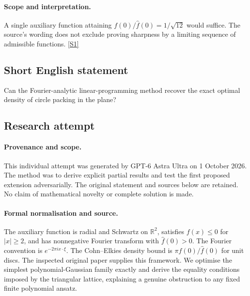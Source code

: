 \documentclass[11pt,a4paper]{article}
\newcommand{\R}{\mathbb{R}}
\newcommand{\sref}[2]{\hyperlink{source:#1:#2}{[S#2]}}
\begin{document}
\paragraph{Scope and interpretation.}

A single auxiliary function attaining $f(0)/\widehat f(0)=1/\sqrt{12}$ would suffice. The source’s wording does not exclude proving sharpness by a limiting sequence of admissible functions. \sref{172}{1}

\subsection{Short English statement}

Can the Fourier-analytic linear-programming method recover the exact optimal density of circle packing in the plane?

\subsection{Research attempt}

\paragraph{Provenance and scope.}
This individual attempt was generated by GPT-6 Astra Ultra on 1 October 2026. The method was to derive explicit partial results and test the first proposed extension adversarially. The original statement and sources below are retained. No claim of mathematical novelty or complete solution is made.

\paragraph{Formal normalisation and source.}
The auxiliary function is radial and Schwartz on $\R^2$, satisfies $f(x)\leq0$ for $|x|\geq2$, and has nonnegative Fourier transform with $\widehat f(0)>0$. The Fourier convention is $e^{-2\pi ix\cdot\xi}$. The Cohn--Elkies density bound is $\pi f(0)/\widehat f(0)$ for unit discs. The inspected original paper supplies this framework. We optimise the simplest polynomial-Gaussian family exactly and derive the equality conditions imposed by the triangular lattice, explaining a genuine obstruction to any fixed finite polynomial ansatz.
\end{document}
